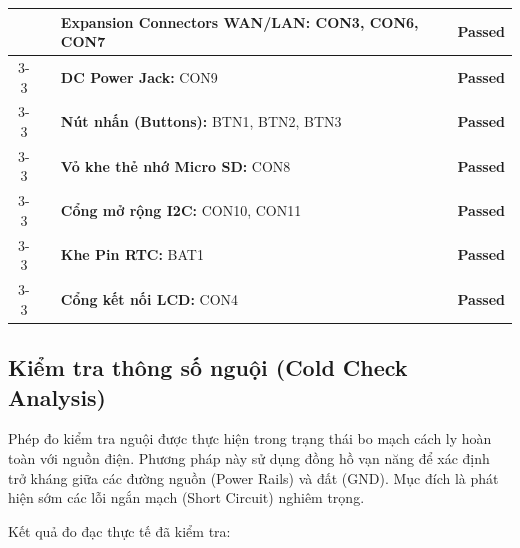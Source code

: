 \begin{longtable}{|c|p{2.5cm}|p{5cm}|p{4cm}|c|}
                & & \textbf{Expansion Connectors WAN/LAN:} CON3, CON6, CON7
                & & \textcolor{modern_blue}{\textbf{Passed}} \\ \cline{3-3} \cline{5-5}
        
                & & \textbf{DC Power Jack:} CON9
                & & \textcolor{modern_blue}{\textbf{Passed}} \\ \cline{3-3} \cline{5-5}
        
                & & \textbf{Nút nhấn (Buttons):} BTN1, BTN2, BTN3
                & & \textcolor{modern_blue}{\textbf{Passed}} \\ \cline{3-3} \cline{5-5}
        
                & & \textbf{Vỏ khe thẻ nhớ Micro SD:} CON8
                & & \textcolor{modern_blue}{\textbf{Passed}} \\ \cline{3-3} \cline{5-5}
        
                & & \textbf{Cổng mở rộng I2C:} CON10, CON11
                & & \textcolor{modern_blue}{\textbf{Passed}} \\ \cline{3-3} \cline{5-5}
        
                & & \textbf{Khe Pin RTC:} BAT1
                & & \textcolor{modern_blue}{\textbf{Passed}} \\ \cline{3-3} \cline{5-5}
        
                & & \textbf{Cổng kết nối LCD:} CON4
                & & \textcolor{modern_blue}{\textbf{Passed}} \\ \hline
        \end{longtable}

        \subsection{Kiểm tra thông số nguội (Cold Check Analysis)}
        Phép đo kiểm tra nguội được thực hiện trong trạng thái bo mạch cách ly hoàn toàn với nguồn điện. Phương pháp này sử dụng đồng hồ vạn năng để xác định trở kháng giữa các đường nguồn (Power Rails) và đất (GND). Mục đích là phát hiện sớm các lỗi ngắn mạch (Short Circuit) nghiêm trọng.

        Kết quả đo đạc thực tế đã kiểm tra:


